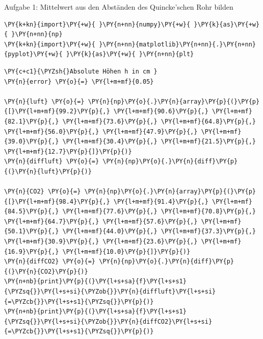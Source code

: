 
    
    Aufgabe 1: Mittelwert aus den Abständen des Quincke'schen Rohr bilden

    \begin{tcolorbox}[breakable, size=fbox, boxrule=1pt, pad at break*=1mm,colback=cellbackground, colframe=cellborder]
\begin{Verbatim}[commandchars=\\\{\}]
\PY{k+kn}{import}\PY{+w}{ }\PY{n+nn}{numpy}\PY{+w}{ }\PY{k}{as}\PY{+w}{ }\PY{n+nn}{np}
\PY{k+kn}{import}\PY{+w}{ }\PY{n+nn}{matplotlib}\PY{n+nn}{.}\PY{n+nn}{pyplot}\PY{+w}{ }\PY{k}{as}\PY{+w}{ }\PY{n+nn}{plt}
\end{Verbatim}
\end{tcolorbox}

    \begin{tcolorbox}[breakable, size=fbox, boxrule=1pt, pad at break*=1mm,colback=cellbackground, colframe=cellborder]
\begin{Verbatim}[commandchars=\\\{\}]
\PY{c+c1}{\PYZsh{}Absolute Höhen h in cm }
\PY{n}{error} \PY{o}{=} \PY{l+m+mf}{0.05}

\PY{n}{luft} \PY{o}{=} \PY{n}{np}\PY{o}{.}\PY{n}{array}\PY{p}{(}\PY{p}{[}\PY{l+m+mf}{99.2}\PY{p}{,} \PY{l+m+mf}{90.6}\PY{p}{,} \PY{l+m+mf}{82.1}\PY{p}{,} \PY{l+m+mf}{73.6}\PY{p}{,} \PY{l+m+mf}{64.8}\PY{p}{,} \PY{l+m+mf}{56.0}\PY{p}{,} \PY{l+m+mf}{47.9}\PY{p}{,} \PY{l+m+mf}{39.0}\PY{p}{,} \PY{l+m+mf}{30.4}\PY{p}{,} \PY{l+m+mf}{21.5}\PY{p}{,} \PY{l+m+mf}{12.7}\PY{p}{]}\PY{p}{)}
\PY{n}{diffluft} \PY{o}{=} \PY{n}{np}\PY{o}{.}\PY{n}{diff}\PY{p}{(}\PY{n}{luft}\PY{p}{)}

\PY{n}{CO2} \PY{o}{=} \PY{n}{np}\PY{o}{.}\PY{n}{array}\PY{p}{(}\PY{p}{[}\PY{l+m+mf}{98.4}\PY{p}{,} \PY{l+m+mf}{91.4}\PY{p}{,} \PY{l+m+mf}{84.5}\PY{p}{,} \PY{l+m+mf}{77.6}\PY{p}{,} \PY{l+m+mf}{70.8}\PY{p}{,} \PY{l+m+mf}{64.7}\PY{p}{,} \PY{l+m+mf}{57.6}\PY{p}{,} \PY{l+m+mf}{50.1}\PY{p}{,} \PY{l+m+mf}{44.0}\PY{p}{,} \PY{l+m+mf}{37.3}\PY{p}{,} \PY{l+m+mf}{30.9}\PY{p}{,} \PY{l+m+mf}{23.6}\PY{p}{,} \PY{l+m+mf}{16.9}\PY{p}{,} \PY{l+m+mf}{10.0}\PY{p}{]}\PY{p}{)}
\PY{n}{diffCO2} \PY{o}{=} \PY{n}{np}\PY{o}{.}\PY{n}{diff}\PY{p}{(}\PY{n}{CO2}\PY{p}{)}
\PY{n+nb}{print}\PY{p}{(}\PY{l+s+sa}{f}\PY{l+s+s1}{\PYZsq{}}\PY{l+s+si}{\PYZob{}}\PY{n}{diffluft}\PY{l+s+si}{=\PYZcb{}}\PY{l+s+s1}{\PYZsq{}}\PY{p}{)}
\PY{n+nb}{print}\PY{p}{(}\PY{l+s+sa}{f}\PY{l+s+s1}{\PYZsq{}}\PY{l+s+si}{\PYZob{}}\PY{n}{diffCO2}\PY{l+s+si}{=\PYZcb{}}\PY{l+s+s1}{\PYZsq{}}\PY{p}{)}


\end{Verbatim}
\end{tcolorbox}

